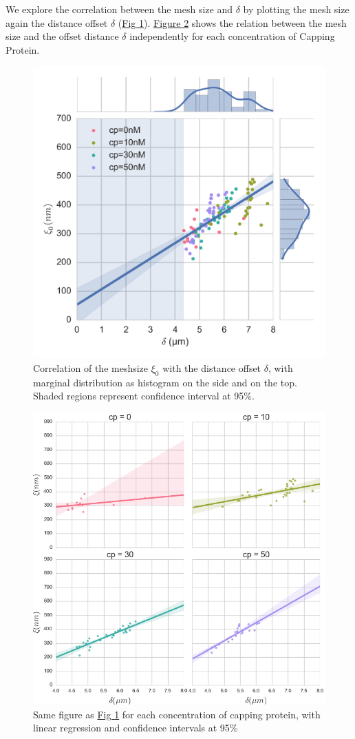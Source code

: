 \documentclass[A4paperpaper,11pt,english]{sphinxmanual}
\begin{document}
We explore the correlation between the mesh size and \(\delta\) by plotting  the mesh size again the distance offset \(\delta\) (\hyperref[parts/part3:dxcf]{Fig  \ref*{parts/part3:dxcf}}).
\hyperref[parts/part3:dxf]{Figure  \ref*{parts/part3:dxf}} shows the relation between the mesh size and the offset
distance \(\delta\) independently for each concentration of Capping Protein.
\begin{figure}[htbp]
\centering
\capstart

\includegraphics[width=0.800\linewidth]{delta-xi-corr.png}
\caption{Correlation of the meshsize \(\xi_0\) with the distance offset \(\delta\),
with marginal distribution as histogram on the side and on the top.  Shaded
regions represent confidence interval at 95\%.}\label{parts/part3:dxcf}\end{figure}
\begin{figure}[htbp]
\centering
\capstart

\includegraphics[width=0.800\linewidth]{delta-xi-facets.png}
\caption{Same figure as \hyperref[parts/part3:dxcf]{Fig  \ref*{parts/part3:dxcf}} for each concentration of capping protein,
with linear regression and confidence intervals at 95\%}\label{parts/part3:dxf}\end{figure}
\end{document}
